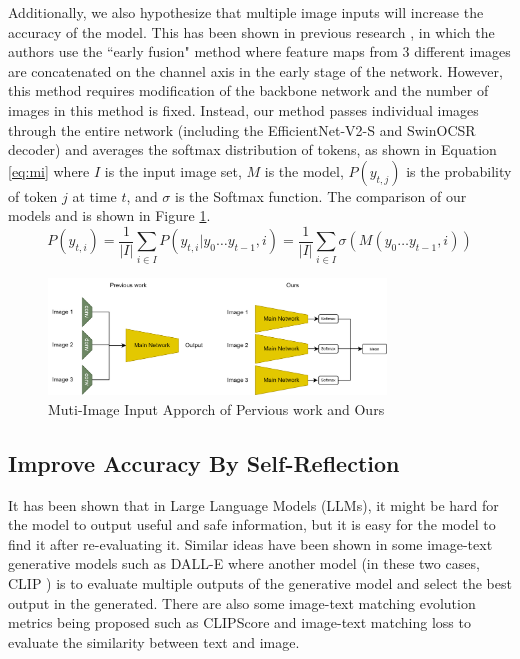 \documentclass[12pt]{article}
\begin{document}
Additionally, we also hypothesize that multiple image inputs will increase the accuracy of the model. This has been shown in previous research \autocite{sun_multi-input_2017}, in which the authors use the ``early fusion" method where feature maps from 3 different images are concatenated on the channel axis in the early stage of the network. However, this method requires modification of the backbone network and the number of images in this method is fixed. Instead, our method passes individual images through the entire network (including the EfficientNet-V2-S and SwinOCSR decoder) and averages the softmax distribution of tokens, as shown in Equation \ref{eq:mi} where $I$ is the input image set, $M$ is the model, $P(y_{t,j})$ is the probability of token $j$  at time $t$, and $\sigma$ is the Softmax function. The comparison of our models and \autocite{sun_multi-input_2017} is shown in Figure \ref{mi}. 
\begin{equation}
    P(y_{t,i})=\frac{1}{|I|}\sum_{i\in I}P(y_{t,i}|y_0 \dots y_{t-1}, i) = \frac{1}{|I|}\sum_{i\in I}\sigma(M(y_0 \dots y_{t-1}, i))
    \label{eqmi}
\end{equation}
\begin{figure}
    \centering
    \includegraphics[width=0.8\textwidth]{mi.drawio.png}
    \caption{Muti-Image Input Apporch of Pervious work \autocite{sun_multi-input_2017} and Ours}
    \label{mi}
\end{figure}


\subsection{Improve Accuracy By Self-Reflection}
It has been shown that in Large Language Models (LLMs), it might be hard for the model to output useful and safe information, but it is easy for the model to find it after re-evaluating it. \autocite{bai_constitutional_2022} Similar ideas have been shown in some image-text generative models such as DALL-E \autocite{ramesh_zero-shot_2021}
where another model (in these two cases, CLIP \autocite{radford_learning_2021}) is to evaluate multiple outputs of the generative model and select the best output in the generated. There are also some image-text matching evolution metrics being proposed such as CLIPScore \autocite{hessel_clipscore:_2022} and image-text matching loss \autocite{xu_attngan:_2017} to evaluate the similarity between text and image. 
\end{document}

